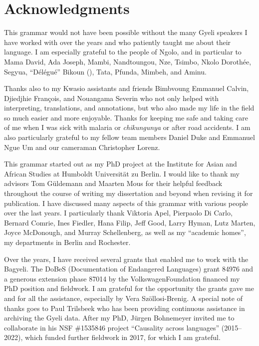 \chapter*{Acknowledgments}
\label{sec:acknowledgments}

This grammar would not have been possible without the many Gyeli speakers I have worked with over the years and who patiently taught me about their language. I am especially grateful to the people of Ngolo, and in particular to Mama David, Ada Joseph, Mambi, Nandtoungou, Nze, Tsimbo, Nkolo Dorothée, Segyua, ``Délégué'' Bikoun (\textdagger), Tata, Pfunda, Mimbeh, and Aminu.

Thanks also to my Kwasio assistants and friends Bimbvoung Emmanuel Calvin, Djiedjhie François, and Nouangama Severin who not only helped with interpreting, translations, and annotations, but who also made my life in the field so much easier and more enjoyable. Thanks for keeping me safe and taking care of me when I was sick with malaria or {\itshape chikungunya} or after road accidents.
I am also particularly grateful to my fellow team members Daniel Duke and Emmanuel Ngue Um and our cameraman Christopher Lorenz.

This grammar started out as my PhD project at the Institute for Asian and African Studies at Humboldt Universität zu Berlin. I would like to thank my advisors Tom Güldemann and Maarten Mous for their helpful feedback throughout the course of writing my dissertation and beyond when revising it for publication.  I have discussed many aspects of this grammar with various people over the last years. I particularly thank Viktoria Apel, Pierpaolo Di Carlo, Bernard Comrie, Ines Fiedler, Hana Filip, Jeff Good, Larry Hyman, Lutz Marten, Joyce McDonough, and Murray Schellenberg, as well as my ``academic homes'', my departments in Berlin and Rochester. 

Over the years, I have received several grants that enabled me to work with the Bagyeli.  The DoBeS (Documentation of Endangered Languages) grant 84976 and a generous extension phase 87014  by the VolkswagenFoundation financed my PhD position and fieldwork.  I am grateful for the opportunity the grants gave me and for all the assistance, especially by Vera Szöllosi-Brenig. A special note of thanks goes to Paul Trilsbeek who has been providing continuous assistance in archiving the Gyeli data.  After my PhD, Jürgen Bohnemeyer invited me to collaborate in his NSF \#1535846 project ``Causality across languages'' (2015--2022), which funded further fieldwork in 2017, for which I am grateful.

